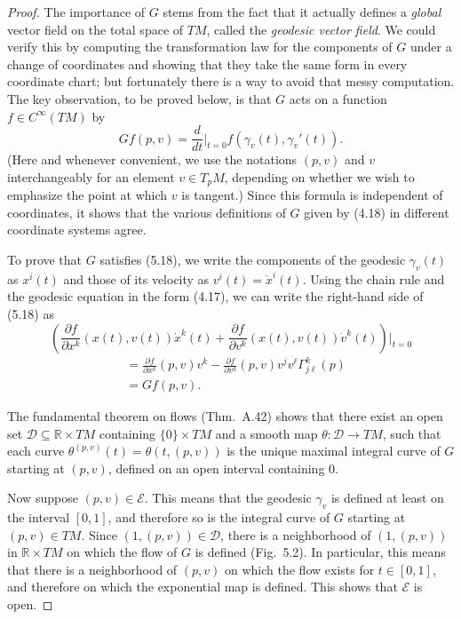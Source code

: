 \begin{proposition}
\begin{proof}
The importance of $G$ stems from the fact that it actually defines a \emph{global} vector field on the total space of $TM$, called the \emph{geodesic vector field}. We could verify this by computing the transformation law for the components of $G$ under a change of coordinates and showing that they take the same form in every coordinate chart; but fortunately there is a way to avoid that messy computation. The key observation, to be proved below, is that $G$ acts on a function $f \in C^\infty(TM)$ by
\begin{equation}
Gf(p,v) = \frac{d}{dt}\bigg|_{t=0} f(\gamma_v(t), \gamma_v'(t)). \tag{5.18}
\end{equation}
(Here and whenever convenient, we use the notations $(p, v)$ and $v$ interchangeably for an element $v \in T_p M$, depending on whether we wish to emphasize the point at which $v$ is tangent.) Since this formula is independent of coordinates, it shows that the various definitions of $G$ given by (4.18) in different coordinate systems agree.

To prove that $G$ satisfies (5.18), we write the components of the geodesic $\gamma_v(t)$ as $x^i(t)$ and those of its velocity as $v^i(t) = \dot{x}^i(t)$. Using the chain rule and the geodesic equation in the form (4.17), we can write the right-hand side of (5.18) as
\[
\left(\frac{\partial f}{\partial x^k}(x(t), v(t))\dot{x}^k(t) + \frac{\partial f}{\partial v^k}(x(t), v(t))\dot{v}^k(t)\right)\bigg|_{t=0}
\]
\begin{align*}
&= \frac{\partial f}{\partial x^k}(p, v)v^k - \frac{\partial f}{\partial v^k}(p,v)v^j v^\ell \Gamma^k_{j\ell}(p) \\
&= Gf(p,v).
\end{align*}

The fundamental theorem on flows (Thm.\ A.42) shows that there exist an open set $\mathcal{D} \subseteq \mathbb{R} \times TM$ containing $\{0\} \times TM$ and a smooth map $\theta : \mathcal{D} \to TM$, such that each curve $\theta^{(p,v)}(t) = \theta(t, (p,v))$ is the unique maximal integral curve of $G$ starting at $(p,v)$, defined on an open interval containing $0$.

Now suppose $(p,v) \in \mathcal{E}$. This means that the geodesic $\gamma_v$ is defined at least on the interval $[0, 1]$, and therefore so is the integral curve of $G$ starting at $(p, v) \in TM$. Since $(1, (p,v)) \in \mathcal{D}$, there is a neighborhood of $(1, (p,v))$ in $\mathbb{R} \times TM$ on which the flow of $G$ is defined (Fig.\ 5.2). In particular, this means that there is a neighborhood of $(p,v)$ on which the flow exists for $t \in [0, 1]$, and therefore on which the exponential map is defined. This shows that $\mathcal{E}$ is open.


\end{proof}
\end{proposition}
